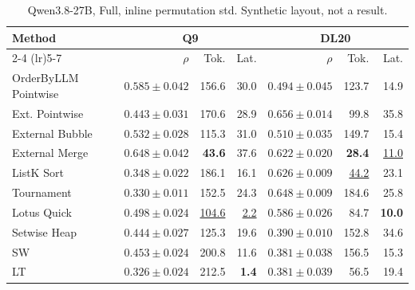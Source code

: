\begin{table}[t]
\centering\footnotesize\setlength{\tabcolsep}{3.2pt}\renewcommand{\arraystretch}{1.12}
\caption{Qwen3.8-27B, Full, inline permutation std. Synthetic layout, not a result.}
\begin{tabular}{@{}lrrrrrr@{}}
\toprule
Method & \multicolumn{3}{c}{Q9} & \multicolumn{3}{c}{DL20} \\
\cmidrule(lr){2-4} \cmidrule(lr){5-7}
 & $\rho$ & Tok. & Lat. & $\rho$ & Tok. & Lat. \\
\midrule
OrderByLLM Pointwise & \underline{$0.585\pm0.042$} & 156.6 & 30.0 & $0.494\pm0.045$ & 123.7 & 14.9 \\
Ext. Pointwise & $0.443\pm0.031$ & 170.6 & 28.9 & \textbf{$0.656\pm0.014$} & 99.8 & 35.8 \\
External Bubble & $0.532\pm0.028$ & 115.3 & 31.0 & $0.510\pm0.035$ & 149.7 & 15.4 \\
External Merge & \textbf{$0.648\pm0.042$} & \textbf{43.6} & 37.6 & $0.622\pm0.020$ & \textbf{28.4} & \underline{11.0} \\
ListK Sort & $0.348\pm0.022$ & 186.1 & 16.1 & $0.626\pm0.009$ & \underline{44.2} & 23.1 \\
Tournament & $0.330\pm0.011$ & 152.5 & 24.3 & \underline{$0.648\pm0.009$} & 184.6 & 25.8 \\
Lotus Quick & $0.498\pm0.024$ & \underline{104.6} & \underline{2.2} & $0.586\pm0.026$ & 84.7 & \textbf{10.0} \\
Setwise Heap & $0.444\pm0.027$ & 125.3 & 19.6 & $0.390\pm0.010$ & 152.8 & 34.6 \\
SW & $0.453\pm0.024$ & 200.8 & 11.6 & $0.381\pm0.038$ & 156.5 & 15.3 \\
LT & $0.326\pm0.024$ & 212.5 & \textbf{1.4} & $0.381\pm0.039$ & 56.5 & 19.4 \\
\bottomrule
\end{tabular}
\end{table}


